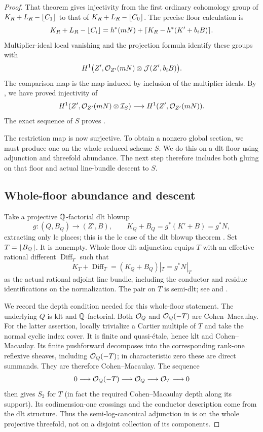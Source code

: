 \begin{proof}
That theorem gives injectivity from the first ordinary cohomology
group of $K_R+L_R-\lfloor C_1\rfloor$ to that of
$K_R+L_R-\lfloor C_0\rfloor$. The precise floor calculation is
\begin{equation}
\label{eq:signed-floor-calculation}
 K_R+L_R-\lfloor C_i\rfloor
 =h^*(mN)+\lceil K_R-h^*(K'+b_iB)\rceil.
\end{equation}
Multiplier-ideal local vanishing and the projection formula
\cite[Theorem~3.3]{Fujino2011} identify these groups with
\[
 H^1\bigl(Z',\mathcal O_{Z'}(mN)\otimes\mathcal J(Z',b_iB)\bigr).
\]
The comparison map is the map induced by inclusion of the
multiplier ideals. By , we have
proved injectivity of
\[
 H^1(Z',\mathcal O_{Z'}(mN)\otimes\mathcal I_S)
 \longrightarrow H^1(Z',\mathcal O_{Z'}(mN)).
\]
The exact sequence of $S$ proves
.

The restriction map is now surjective. To obtain a nonzero global
section, we must produce one on the whole reduced scheme $S$.
We do this on a dlt floor using adjunction and threefold abundance.
The next step therefore includes both gluing on that floor and
actual line-bundle descent to $S$.

\subsection*{Whole-floor abundance and descent}

Take a projective $\mathbb Q$-factorial dlt blowup
\[
 g:(Q,B_Q)\longrightarrow(Z',B),\qquad
 K_Q+B_Q=g^*(K'+B)=g^*N,
\]
extracting only lc places; this is the lc case of the dlt blowup
theorem \cite[Theorem~2.10]{FujinoHashizume2023}. Set
$T=\lfloor B_Q\rfloor$. It is nonempty. Whole-floor dlt adjunction equips
$T$ with an effective rational different $\operatorname{Diff}_T$
such that
\begin{equation}
\label{eq:signed-whole-floor-adjunction}
 K_T+\operatorname{Diff}_T
 =(K_Q+B_Q)|_T=g^*N|_T
\end{equation}
as the actual rational adjoint line bundle, including the conductor
and residue identifications on the normalization. The pair on $T$
is semi-dlt; see \cite[Remark~1.2(3)]{Fujino2000} and
\cite[Remark~2.7]{FujinoGongyo2014}.

We record the depth condition needed for this whole-floor statement.
The underlying $Q$ is klt and $\mathbb Q$-factorial. Both $\mathcal O_Q$ and
$\mathcal O_Q(-T)$ are Cohen--Macaulay. For the latter assertion, locally
trivialize a Cartier multiple of $T$ and take the normal cyclic index
cover. It is finite and quasi-\'etale, hence klt and Cohen--Macaulay.
Its finite pushforward decomposes into the corresponding rank-one
reflexive sheaves, including $\mathcal O_Q(-T)$; in characteristic zero
these are direct summands. They are therefore Cohen--Macaulay.
The sequence
\[
 0\longrightarrow\mathcal O_Q(-T)\longrightarrow\mathcal O_Q
 \longrightarrow\mathcal O_T\longrightarrow0
\]
then gives $S_2$ for $T$ (in fact the required Cohen--Macaulay depth
along its support). Its codimension-one crossings and the conductor
description come from the dlt structure. Thus the semi-log-canonical
adjunction in  is on the
whole projective threefold, not on a disjoint collection of its
components.


\end{proof}

